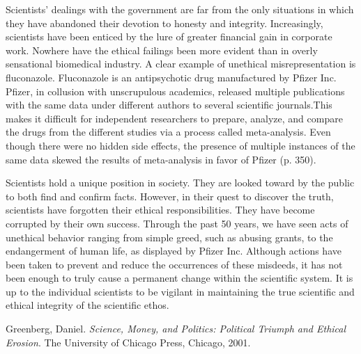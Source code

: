 \documentclass{article}[12pt]
\begin{document}
Scientists' dealings with the government are far from the only situations in
which they have abandoned their devotion to honesty and integrity.
Increasingly, scientists have been enticed by the lure of greater financial
gain in corporate work. Nowhere have the ethical failings been more evident
than in overly sensational biomedical industry. A clear example of unethical
misrepresentation is fluconazole.  Fluconazole is an antipsychotic drug
manufactured by Pfizer Inc.  Pfizer, in collusion with unscrupulous academics,
released multiple publications with the same data under different authors to
several scientific journals.This makes it difficult for independent researchers
to prepare, analyze, and compare the drugs from  the different studies via a
process called meta-analysis. Even though there were no hidden side effects, 
the presence of multiple instances of the same
data skewed the results of meta-analysis in favor of Pfizer (p. 350).

Scientists hold a unique position in society. They are looked toward by the
public to both find and confirm facts. However, in their quest to discover the
truth, scientists have forgotten their ethical responsibilities.  They have
become corrupted by their own success.  Through the past 50 years, we have seen
acts of unethical behavior ranging from simple greed, such as abusing grants,
to the endangerment of human life, as displayed by Pfizer Inc.  Although
actions have been taken to prevent and reduce the occurrences of these
misdeeds, it has not been enough to truly cause a permanent change within the
scientific system. It is up to the individual scientists to be vigilant in
maintaining the true scientific and ethical integrity of the scientific ethos.

\newpage
\begin{thebibliography}{9}

  Greenberg, Daniel.
  \emph{Science, Money, and Politics: Political Triumph and Ethical Erosion}.
  The University of Chicago Press, Chicago,
  2001.

\end{thebibliography}
\end{document}
